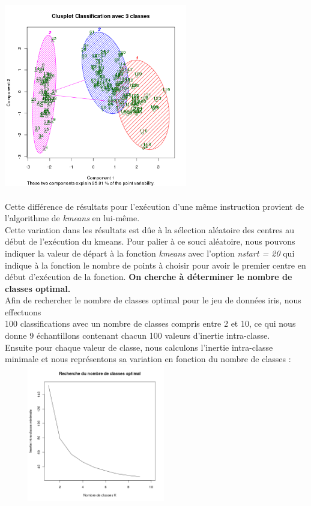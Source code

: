 \documentclass[a4paper, 10pt]{article}
\begin{document}
\includegraphics[height = 8cm, width = 8cm]{plots/clusplot_kmeans_4.png}\\ \\
Cette diff\'erence de r\'esultats pour l'ex\'ecution d'une m\^eme instruction provient de l'algorithme de \textit{kmeans} en lui-m\^eme.\\
Cette variation dans les r\'esultats est d\^ue \`a la s\'election al\'eatoire des centres au d\'ebut de l'ex\'ecution du kmeans.
Pour palier \`a ce souci al\'eatoire, nous pouvons indiquer la valeur de d\'epart \`a la fonction \textit{kmeans} avec l'option \textit{nstart = 20}
qui indique \`a la fonction le nombre de points \`a choisir pour avoir le premier centre en d\'ebut d'ex\'ecution de la fonction.
\newpage
\noindent
\textbf{On cherche \`a d\'eterminer le nombre de classes optimal.}\\
Afin de rechercher le nombre de classes optimal pour le jeu de donn\'ees iris, nous effectuons\\100 classifications avec un nombre de classes
compris entre 2 et 10, ce qui nous donne 9 \'echantillons contenant chacun 100 valeurs d'inertie intra-classe.\\
Ensuite pour chaque valeur de classe, nous calculons l'inertie intra-classe minimale et nous repr\'esentons sa variation
en fonction du nombre de classes :\\
\includegraphics[height = 6cm, width = 8cm]{plots/plot_inertie_intra_1.png}\\ \\
\end{document}
